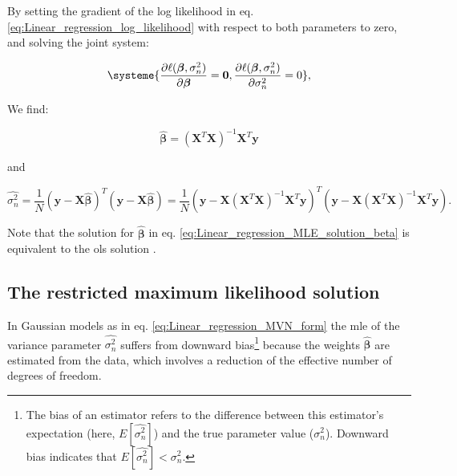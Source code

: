 By setting the gradient of the log likelihood in eq. \eqref{eq:Linear_regression_log_likelihood} with respect to both parameters to zero, and solving the joint system:

\begin{equation} \label{eq:Linear_regression_MLE_system}
\systeme{
    \dfrac{\partial \ell(\boldsymbol{\beta}, \sigma_n^2)}{\partial \boldsymbol{\beta}} = \mathbf{0},
    \dfrac{\partial \ell(\boldsymbol{\beta}, \sigma_n^2)}{\partial \sigma_n^2} = 0
    },
\end{equation}

We find:

\begin{equation} \label{eq:Linear_regression_MLE_solution_beta}
\hat{\boldsymbol{\beta}} = (\mathbf{X}^T\mathbf{X})^{-1}\mathbf{X}^T\mathbf{y} 
\end{equation}

and

\begin{equation} \label{eq:Linear_regression_MLE_solution_sigma}
 \hat{\sigma_n^2} = \frac{1}{N}(\mathbf{y}-\mathbf{X}\hat{\boldsymbol{\beta}})^T(\mathbf{y}-\mathbf{X}\hat{\boldsymbol{\beta}}) = \frac{1}{N}(\mathbf{y}-\mathbf{X}(\mathbf{X}^T\mathbf{X})^{-1}\mathbf{X}^T\mathbf{y})^T(\mathbf{y}-\mathbf{X}(\mathbf{X}^T\mathbf{X})^{-1}\mathbf{X}^T\mathbf{y}). 
\end{equation}

Note that the solution for $\hat{\boldsymbol{\beta}}$ in eq. \eqref{eq:Linear_regression_MLE_solution_beta} is equivalent to the \gls{ols} solution \cite{hayashi2000econometrics}.

\newpage

\subsection{The restricted maximum likelihood solution}


In Gaussian models as in eq. \eqref{eq:Linear_regression_MVN_form} the \gls{mle} of the variance parameter $\hat{\sigma_n^2}$ suffers from downward bias\footnote{The bias of an estimator refers to the difference between this estimator’s expectation (here, $E[\hat{\sigma_n^2}]$) and the true parameter value ($\sigma_n^2$).
Downward bias indicates that $E[\hat{\sigma_n^2}] < \sigma_n^2$.} because the weights $\hat{\boldsymbol{\beta}}$ are estimated from the data, which involves a reduction of the effective number of degrees of freedom. \\

